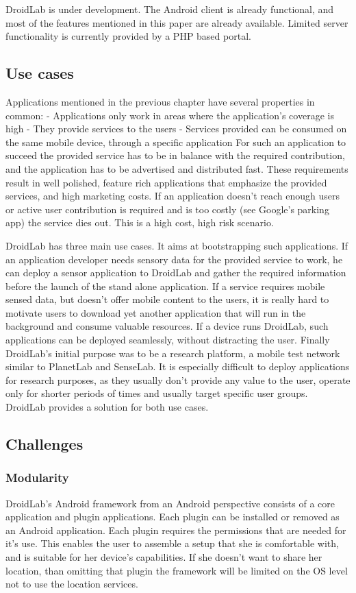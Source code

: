 \documentclass[conference,letterpaper]{IEEEtran}
\begin{document}
DroidLab is under development. The Android client is already functional, and most of the features mentioned in this paper are already available. Limited server functionality is currently provided by a PHP based portal.

\subsection{Use cases}
\label{sec:use_cases}
Applications mentioned in the previous chapter have several properties in common:
- Applications only work in areas where the application's coverage is high
- They provide services to the users
- Services provided can be consumed on the same mobile device, through a specific application
For such an application to succeed the provided service has to be in balance with the required contribution, and the application has to be advertised and distributed fast. These requirements result in well polished, feature rich applications that emphasize the provided services, and high marketing costs. If an application doesn't reach enough users or active user contribution is required and is too costly (see Google's parking app) the service dies out. This is a high cost, high risk scenario.

DroidLab has three main use cases. It aims at bootstrapping such applications. If an application developer needs sensory data for the provided service to work, he can deploy a sensor application to DroidLab and gather the required information before the launch of the stand alone application. If a service requires mobile sensed data, but doesn't offer mobile content to the users, it is really hard to motivate users to download yet another application that will run in the background and consume valuable resources. If a device runs DroidLab, such applications can be deployed seamlessly, without distracting the user. Finally DroidLab's initial purpose was to be a research platform, a mobile test network similar to PlanetLab and SenseLab. It is especially difficult to deploy applications for research purposes, as they usually don't provide any value to the user, operate only for shorter periods of times and usually target specific user groups. DroidLab provides a solution for both use cases.

\subsection{Challenges}
\subsubsection{Modularity}
DroidLab's Android framework from an Android perspective consists of a core application and plugin applications. Each plugin can be installed or removed as an Android application. Each plugin requires the permissions that are needed for it's use. This enables the user to assemble a setup that she is comfortable with, and is suitable for her device's capabilities. If she doesn't want to share her location, than omitting that plugin the framework will be limited on the OS level not to use the location services.
\end{document}
